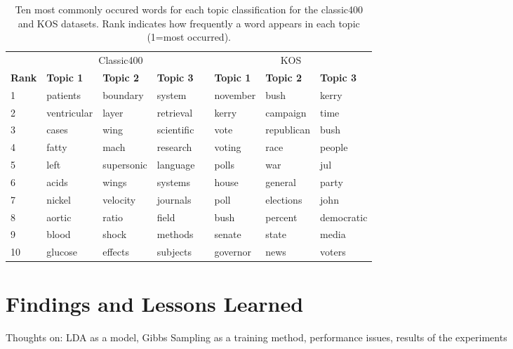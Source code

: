 \documentclass[10pt]{article}
\newcommand{\ra}[1]{\renewcommand{\arraystretch}{#1}}
\begin{document}
\begin{table}
	\centering
    \ra{1.2}
	\begin{tabular}{@{} l l l l c l l l @{}}
        \toprule
        & \multicolumn{3}{c}{Classic400} & \phantom{abc} & \multicolumn{3}{c}{KOS}\\
        \cmidrule{2-4} \cmidrule{6-8}
        \bf{Rank} & \bf{Topic 1} & \bf{Topic 2} & \bf{Topic 3} && \bf{Topic 1} & \bf{Topic 2} & \bf{Topic 3} \\
        \midrule
         1 & patients    & boundary   & system     && november & bush       & kerry \\
         2 & ventricular & layer      & retrieval  && kerry    & campaign   & time \\
         3 & cases       & wing       & scientific && vote     & republican & bush \\
         4 & fatty       & mach       & research   && voting   & race       & people \\
         5 & left        & supersonic & language   && polls    & war        & jul \\
         6 & acids       & wings      & systems    && house    & general    & party \\
         7 & nickel      & velocity   & journals   && poll     & elections  & john \\
         8 & aortic      & ratio      & field      && bush     & percent    & democratic \\
         9 & blood       & shock      & methods    && senate   & state      & media \\
        10 & glucose     & effects    & subjects   && governor & news       & voters \\
        \bottomrule
	\end{tabular}
	\caption{Ten most commonly occured words for each topic classification for the classic400 and KOS datasets. Rank indicates how frequently a word appears in each topic (1=most occurred).}
	\label{tab:most_common}
\end{table}



\section{Findings and Lessons Learned}
\label{sec:conclusion}

Thoughts on: LDA as a model, Gibbs Sampling as a training method, performance issues, results of the experiments




\end{document}
